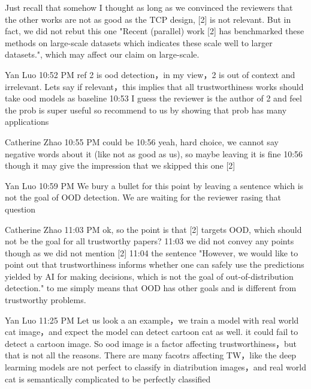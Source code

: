 Just recall that somehow I thought as long as we convinced the reviewers that the other works are not as good as the TCP design, [2] is not relevant. But in fact, we did not rebut this one "Recent (parallel) work [2] has benchmarked these methods on large-scale datasets which indicates these scale well to larger datasets.", which may affect our claim on large-scale.

Yan Luo  10:52 PM
ref 2 is ood detection，in my view，2 is out of context and irrelevant. Lets say if relevant，this implies that all trustworthiness works should take ood models as baseline
10:53
I guess the reviewer is the author of 2 and feel the prob is super useful so recommend to us by showing that prob has many applications

Catherine Zhao  10:55 PM
could be
10:56
yeah, hard choice, we cannot say negative words about it (like not as good as us), so maybe leaving it is fine
10:56
though it may give the impression that we skipped this one [2]

Yan Luo  10:59 PM
We bury a bullet for this point by leaving a sentence which is not the goal of OOD detection. We are waiting for the reviewer rasing that question

Catherine Zhao  11:03 PM
ok, so the point is that [2] targets OOD, which should not be the goal for all trustworthy papers?
11:03
we did not convey any points though as we did not mention [2]
11:04
the sentence "However, we would like to point out that trustworthiness informs whether one can safely use the predictions yielded by AI for making decisions, which is not the goal of out-of-distribution detection." to me simply means that OOD has other goals and is different from trustworthy problems.

Yan Luo  11:25 PM
Let us look a an example，we train a model with real world cat image，and expect the model can detect cartoon cat as well. it could fail to detect a cartoon image. So ood image is a factor affecting trustworthiness，but that is not all the reasons. There are many facotrs affecting TW，like the deep learming models are not perfect to classify in diatribution images，and real world cat is semantically complicated to be perfectly classified